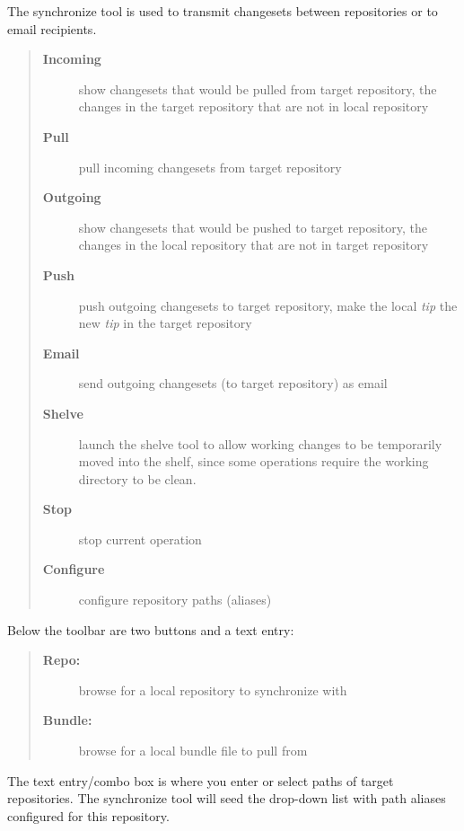 \documentclass[letterpaper,10pt,english]{manual}
\begin{document}
The synchronize tool is used to transmit changesets between repositories
or to email recipients.
\begin{quote}
\begin{description}
\item[\textbf{Incoming}]
show changesets that would be pulled from target repository, the
changes in the target repository that are not in local repository

\item[\textbf{Pull}]
pull incoming changesets from target repository

\item[\textbf{Outgoing}]
show changesets that would be pushed to target repository, the
changes in the local repository that are not in target
repository

\item[\textbf{Push}]
push outgoing changesets to target repository, make the local
\emph{tip} the new \emph{tip} in the target repository

\item[\textbf{Email}]
send outgoing changesets (to target repository) as email

\item[\textbf{Shelve}]
launch the shelve tool to allow working changes to be
temporarily moved into the shelf, since some operations require
the working directory to be clean.

\item[\textbf{Stop}]
stop current operation

\item[\textbf{Configure}]
configure repository paths (aliases)

\end{description}
\end{quote}

Below the toolbar are two buttons and a text entry:
\begin{quote}
\begin{description}
\item[\textbf{Repo:}]
browse for a local repository to synchronize with

\item[\textbf{Bundle:}]
browse for a local bundle file to pull from

\end{description}
\end{quote}

The text entry/combo box is where you enter or select paths of target
repositories. The synchronize tool will seed the drop-down list with
path aliases configured for this repository.
\end{document}
